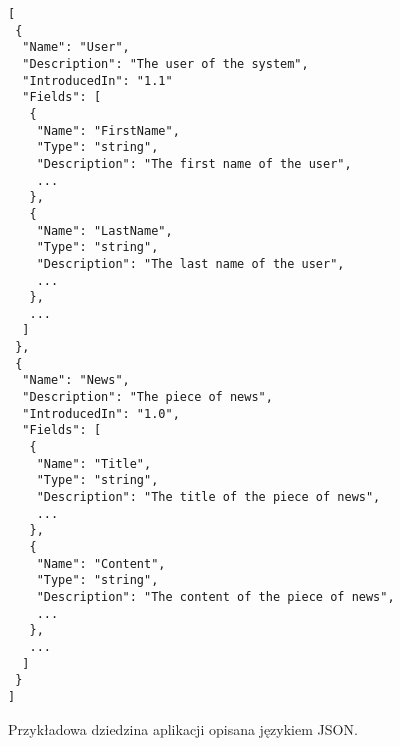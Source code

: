 \begin{figure}[!ht]
\begin{verbatim}
[
 {
  "Name": "User",
  "Description": "The user of the system",
  "IntroducedIn": "1.1"
  "Fields": [
   {
    "Name": "FirstName",
    "Type": "string",
    "Description": "The first name of the user",
    ...
   },
   {
    "Name": "LastName",
    "Type": "string",
    "Description": "The last name of the user",
    ...
   },
   ...
  ]
 },
 {
  "Name": "News",
  "Description": "The piece of news",
  "IntroducedIn": "1.0",
  "Fields": [
   {
    "Name": "Title",
    "Type": "string",
    "Description": "The title of the piece of news",
    ...
   },
   {
    "Name": "Content",
    "Type": "string",
    "Description": "The content of the piece of news",
    ...
   },
   ...
  ]
 }
]
\end{verbatim}

\caption{Przykładowa dziedzina aplikacji opisana językiem JSON.}
\label{fig:implementation_core:json}
\end{figure}
